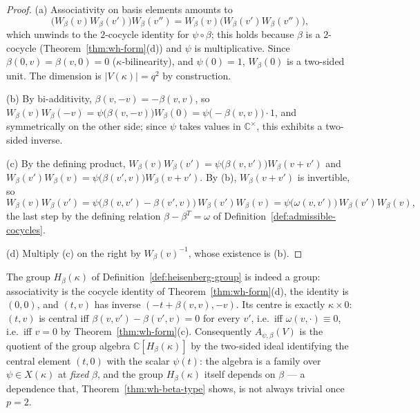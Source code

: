 \begin{proof}
(a) Associativity on basis elements amounts to
\[
\big(W_\beta(v)W_\beta(v')\big)W_\beta(v'')=W_\beta(v)\big(W_\beta(v')W_\beta(v'')\big),
\]
which unwinds to the $2$-cocycle identity for $\psi\circ\beta$; this holds
because $\beta$ is a $2$-cocycle (Theorem~\ref{thm:wh-form}(d)) and $\psi$ is
multiplicative. Since $\beta(0,v)=\beta(v,0)=0$ ($\kappa$-bilinearity), and
$\psi(0)=1$, $W_\beta(0)$ is a two-sided unit. The dimension is
$|V(\kappa)|=q^2$ by construction.

(b) By bi-additivity, $\beta(v,-v)=-\beta(v,v)$, so
$W_\beta(v)W_\beta(-v)=\psi\big(\beta(v,-v)\big)W_\beta(0)=\psi\big(-\beta(v,v)\big)\cdot 1$,
and symmetrically on the other side; since $\psi$ takes values in
$\mathbb{C}^\times$, this exhibits a two-sided inverse.

(c) By the defining product, $W_\beta(v)W_\beta(v')=\psi\big(\beta(v,v')\big)W_\beta(v+v')$
and $W_\beta(v')W_\beta(v)=\psi\big(\beta(v',v)\big)W_\beta(v+v')$. By (b),
$W_\beta(v+v')$ is invertible, so
\[
W_\beta(v)W_\beta(v') = \psi\big(\beta(v,v')-\beta(v',v)\big)\,W_\beta(v')W_\beta(v)
= \psi\big(\omega(v,v')\big)\,W_\beta(v')W_\beta(v),
\]
the last step by the defining relation $\beta-\beta^T=\omega$ of
Definition~\ref{def:admissible-cocycles}.

(d) Multiply (c) on the right by $W_\beta(v)^{-1}$, whose existence is (b).
\end{proof}

\begin{remark}
The group $H_\beta(\kappa)$ of Definition~\ref{def:heisenberg-group} is
indeed a group: associativity is the cocycle identity of
Theorem~\ref{thm:wh-form}(d), the identity is $(0,0)$, and $(t,v)$ has
inverse $(-t+\beta(v,v),-v)$. Its centre is exactly $\kappa\times 0$: $(t,v)$
is central iff $\beta(v,v')-\beta(v',v)=0$ for every $v'$, i.e.\ iff
$\omega(v,\cdot)\equiv 0$, i.e.\ iff $v=0$ by
Theorem~\ref{thm:wh-form}(c). Consequently $A_{\psi,\beta}(V)$ is the
quotient of the group algebra $\mathbb{C}[H_\beta(\kappa)]$ by the two-sided
ideal identifying the central element $(t,0)$ with the scalar $\psi(t)$: the
algebra is a family over $\psi\in X(\kappa)$ at \emph{fixed} $\beta$, and the
group $H_\beta(\kappa)$ itself depends on $\beta$ — a dependence that,
Theorem~\ref{thm:wh-beta-type} shows, is not always trivial once $p=2$.
\end{remark}

